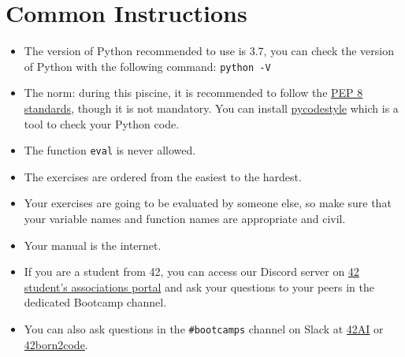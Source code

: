 
\chapter{Common Instructions}
\begin{itemize}
  \item The version of Python recommended to use is 3.7, you can
  check the version of Python with the following command: \texttt{python -V}
  
  \item The norm: during this piscine, it is recommended to follow the
  \href{https://www.python.org/dev/peps/pep-0008/}{PEP 8 standards}, though it is not mandatory.
  You can install \href{https://pypi.org/project/pycodestyle}{pycodestyle} which
  is a tool to check your Python code.
  
  \item The function \texttt{eval} is never allowed.
  
  \item The exercises are ordered from the easiest to the hardest.
  
  \item Your exercises are going to be evaluated by someone else,
  so make sure that your variable names and function names are appropriate and civil. 
  
  \item Your manual is the internet.
  
  \item If you are a student from 42, you can access our Discord server 
  on \href{https://discord.com/channels/887850395697807362/887850396314398720}{42 student's associations portal} and ask your
  questions to your peers in the dedicated Bootcamp channel.

  \item You can also ask questions in the \texttt{\#bootcamps} channel on Slack at \href{https://42-ai.slack.com}{42AI}
  or \href{42born2code.slack.com}{42born2code}.
  

\end{itemize}
